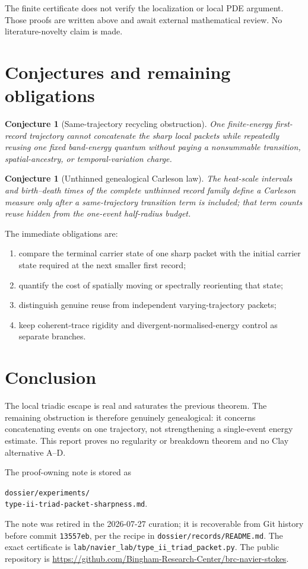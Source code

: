 \documentclass[11pt]{article}
\newtheorem{conjecture}[theorem]{Conjecture}
\theoremstyle{remark}
\begin{document}
The finite certificate does not verify the localization or local PDE
argument.  Those proofs are written above and await external mathematical
review.  No literature-novelty claim is made.

\section{Conjectures and remaining obligations}

\begin{conjecture}[Same-trajectory recycling obstruction]
One finite-energy first-record trajectory cannot concatenate the sharp local
packets while repeatedly reusing one fixed band-energy quantum without
paying a nonsummable transition, spatial-ancestry, or temporal-variation
charge.
\end{conjecture}

\begin{conjecture}[Unthinned genealogical Carleson law]
The heat-scale intervals and birth--death times of the complete unthinned
record family define a Carleson measure only after a same-trajectory
transition term is included; that term counts reuse hidden from the
one-event half-radius budget.
\end{conjecture}

The immediate obligations are:
\begin{enumerate}
\item compare the terminal carrier state of one sharp packet with the
initial carrier state required at the next smaller first record;
\item quantify the cost of spatially moving or spectrally reorienting that
state;
\item distinguish genuine reuse from independent varying-trajectory
packets;
\item keep coherent-trace rigidity and divergent-normalised-energy control
as separate branches.
\end{enumerate}

\section{Conclusion}

The local triadic escape is real and saturates the previous theorem.  The
remaining obstruction is therefore genuinely genealogical: it concerns
concatenating events on one trajectory, not strengthening a single-event
energy estimate.  This report proves no regularity or breakdown theorem and
no Clay alternative A--D.

The proof-owning note is stored as
\begin{center}
\small
\texttt{dossier/experiments/}\\
\texttt{type-ii-triad-packet-sharpness.md}.
\end{center}
The note was retired in the 2026-07-27 curation; it is recoverable from
Git history before commit \texttt{13557eb}, per the recipe in
\texttt{dossier/records/README.md}.
The exact certificate is
\texttt{lab/navier\_lab/type\_ii\_triad\_packet.py}.
The public repository is
\url{https://github.com/Bingham-Research-Center/brc-navier-stokes}.
\end{document}
